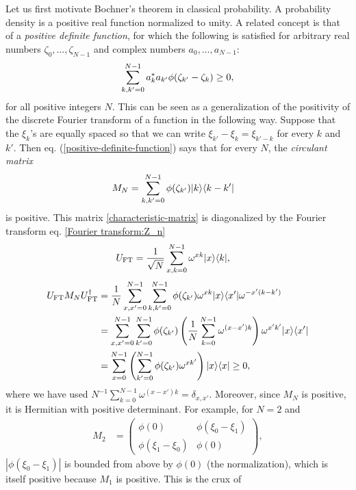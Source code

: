 Let us first motivate Bochner's theorem in classical probability. A probability density is a positive real function normalized to unity. A related concept is that of a \emph{positive definite function}, for which the following is satisfied for arbitrary real numbers $\zeta_0,\dots,\zeta_{N-1}$ and complex numbers $a_0,\dots,a_{N-1}$:
\begin{equation}\label{positive-definite-function}
\sum_{k,k'=0}^{N-1} \conj a_{k}a_{k'} \phi(\zeta_{k'}-\zeta_k)\geq0,
\end{equation}
for all positive integers $N$. This can be seen as a generalization of the positivity of the discrete Fourier transform of a function in the following way. Suppose that the $\xi_k$'s are equally spaced so that we can write $\xi_{k'} - \xi_k = \xi_{k'-k}$ for every $k$ and $k'$. Then eq. (\ref{positive-definite-function}) says that for every $N$, the \emph{circulant matrix}
\begin{align}\label{characteristic-matrix}
M_N &= \sum_{k,k'=0}^{N-1} \phi(\zeta_{k'}) \ketbra{k}{k-k'}
\end{align}
is positive. This matrix \eqref{characteristic-matrix} is diagonalized by the Fourier transform eq. \eqref{Fourier transform:Z_n}
\begin{align}
U_{\text{FT}} &= \frac{1}{\sqrt{N}} \sum_{x,k=0}^{N-1} \omega^{xk} {\left\vert{x}\right\rangle}{\left\langle{k}\right\vert},
\end{align}
\begin{align*}
U_{\text{FT}} M_N U^{\dagger}_{\text{FT}}
&= \frac{1}{N} \sum_{x,x'=0}^{N-1} \sum_{k,k'=0}^{N-1}
\phi(\zeta_{k'}) \omega^{xk} {\left\vert{x}\right\rangle}{\left\langle{x'}\right\vert} \omega^{-x'(k-k')} \\
&= \sum_{x,x'=0}^{N-1} \sum_{k'=0}^{N-1} \phi(\zeta_{k'})
\left( \frac{1}{N} \sum_{k=0}^{N-1} \omega^{(x-x')k}  \right) \omega^{x'k'} {\left\vert{x}\right\rangle}{\left\langle{x'}\right\vert} \\
&= \sum_{x=0}^{N-1} \left( \sum_{k'=0}^{N-1} \phi(\zeta_{k'}) \omega^{xk'} \right) {\left\vert{x}\right\rangle}{\left\langle{x}\right\vert} \ge 0,
\end{align*}
where we have used $N^{-1} \sum_{k=0}^{N-1} \omega^{(x-x')k} = \delta_{x,x'}$. Moreover, since $M_N$ is positive, it is Hermitian with positive determinant. For example, for $N=2$ and
\begin{align}
	M_2 &= \begin{pmatrix}
		\phi(0) & \phi(\xi_0 - \xi_1) \\
		\phi(\xi_1 - \xi_0) & \phi(0)
	\end{pmatrix},
\end{align}
$|\phi(\xi_0 - \xi_1)|$ is bounded from above by $\phi(0)$ (the normalization), which is itself positive because $M_1$ is positive. This is the crux of \cite{RS2}
